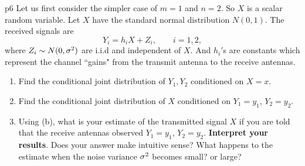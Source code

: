 \documentclass[a4paper, 11pt]{article}
\begin{document}
\begin{problem}{%
    }{p6%
    }
    Let us first consider the simpler case of $m=1$ and $n=2$. So $X$ is a scalar random variable. Let $X$ have the standard normal distribution $N(0,1)$. The received signals are $$Y_i=h_iX+Z_i,\qquad i=1,2,$$where $Z_i\sim N(0,\sigma^2)$ are i.i.d and independent of $X$. And $h_i'$s are constants which represent the channel ``gains" from the transmit antenna to the receive antennas.\begin{enumerate}[label=(\alph*)]
        \item Find the conditional joint distribution of $Y_1,Y_2$ conditioned on $X=x$.
        \item Find the conditional joint distribution of $X$ conditioned on $Y_1=y_1$, $Y_2=y_2$.
        \item Using (b), what is your estimate of the transmitted signal $X$ if you are told that the receive antennas observed $Y_1=y_1$, $Y_2=y_2$. \textbf{Interpret your results}. Does your answer make intuitive sense? What happens to the estimate when the noise variance $\sigma^2$ becomes small? or large?
    \end{enumerate}
\end{problem}
\newpage 
\end{document}
